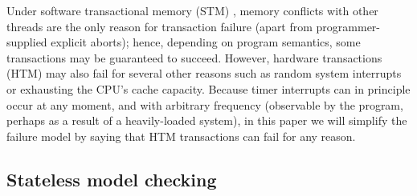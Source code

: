 \documentclass{article}
\begin{document}
\newcommand\hilight[2]{\color{#1}#2\color{black}}



\newcommand\flow[1]{\hilight{brown}{#1}\xspace}
\newcommand\const[1]{\hilight{brickred}{#1}\xspace}
\newcommand\call[1]{\hilight{pinkish}{#1}}

Under software transactional memory (STM) \cite{stm-pldi06},
memory conflicts with other threads are the only reason for transaction failure
(apart from programmer-supplied explicit aborts);
hence, depending on program semantics, some transactions may be guaranteed to succeed.
However, hardware transactions (HTM) may also fail
for several other reasons such as random system interrupts or exhausting the CPU's cache capacity.
Because timer interrupts can in principle occur at any moment,
and with arbitrary frequency (observable by the program, perhaps as a result of a heavily-loaded system),
in this paper we will simplify the failure model by saying that HTM transactions can fail for any reason.

\subsection{Stateless model checking}
\end{document}

